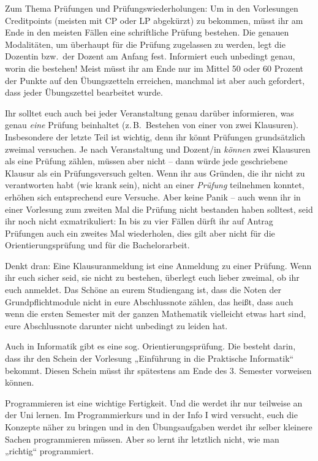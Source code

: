 Zum Thema Prüfungen und Prüfungswiederholungen: Um in den Vorlesungen
Creditpoints (meisten mit CP oder LP abgekürzt) zu bekommen, müsst ihr am Ende
in den meisten Fällen eine schriftliche Prüfung bestehen. Die genauen
Modalitäten, um überhaupt für die Prüfung zugelassen zu werden, legt die
Dozentin bzw.\ der Dozent am Anfang fest.  Informiert euch unbedingt genau,
worin die bestehen! Meist müsst ihr am Ende nur im Mittel 50 oder 60 Prozent
der Punkte auf den Übungszetteln erreichen, manchmal ist aber auch gefordert,
dass jeder Übungszettel bearbeitet wurde.

Ihr solltet euch auch bei jeder Veranstaltung genau darüber informieren, was
genau \emph{eine} Prüfung beinhaltet (z.\,B.\ Bestehen von einer von zwei
Klausuren). Insbesondere der letzte Teil ist wichtig, denn ihr könnt Prüfungen
grundsätzlich zweimal versuchen. Je nach Veranstaltung und Dozent/in
\emph{können} zwei Klausuren als eine Prüfung zählen, müssen aber nicht -- dann
würde jede geschriebene Klausur als ein Prüfungsversuch gelten. Wenn ihr aus
Gründen, die ihr nicht zu verantworten habt (wie krank sein), nicht an einer
\emph{Prüfung} teilnehmen konntet, erhöhen sich entsprechend eure Versuche.
Aber keine Panik -- auch wenn ihr in einer Vorlesung zum zweiten Mal die
Prüfung nicht bestanden haben solltest, seid ihr noch nicht exmatrikuliert: In
bis zu vier Fällen dürft ihr auf Antrag Prüfungen auch ein zweites Mal
wiederholen, dies gilt aber nicht für die Orientierungsprüfung und für die
Bachelorarbeit.

Denkt dran: Eine Klausuranmeldung ist eine Anmeldung zu einer Prüfung. Wenn ihr
euch sicher seid, sie nicht zu bestehen, überlegt euch lieber zweimal, ob ihr
euch anmeldet. Das Schöne an eurem Studiengang ist, dass die Noten der
Grundpflichtmodule nicht in eure Abschlussnote zählen, das heißt, dass auch
wenn die ersten Semester mit der ganzen Mathematik vielleicht etwas hart sind,
eure Abschlussnote darunter nicht unbedingt zu leiden hat.

Auch in Informatik gibt es eine sog. Orientierungsprüfung. Die besteht darin,
dass ihr den Schein der Vorlesung „Einführung in die Praktische Informatik“
bekommt. Diesen Schein müsst ihr spätestens am Ende des 3. Semester vorweisen
können.

Programmieren ist eine wichtige Fertigkeit. Und die werdet ihr nur teilweise an
der Uni lernen. Im Programmierkurs und in der Info I wird versucht, euch die
Konzepte näher zu bringen und in den Übungsaufgaben werdet ihr selber kleinere
Sachen programmieren müssen. Aber so lernt ihr letztlich nicht, wie man
„richtig“ programmiert.

